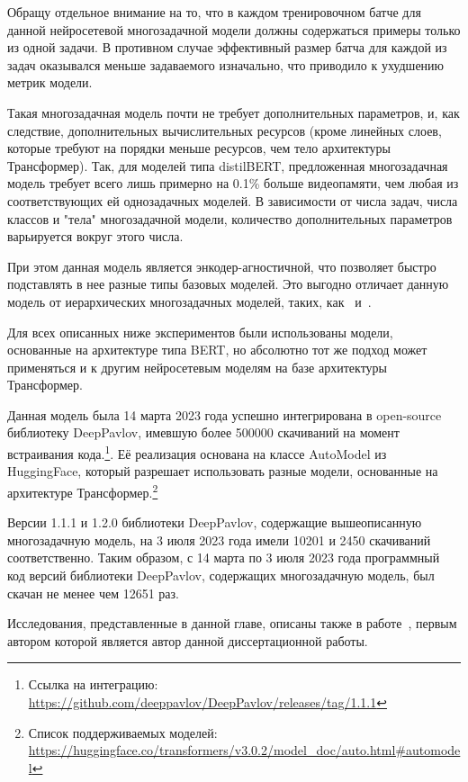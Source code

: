 Обращу отдельное внимание на то, что в каждом тренировочном батче для данной нейросетевой многозадачной модели должны содержаться примеры только из одной задачи. В противном случае эффективный размер батча для каждой из задач оказывался меньше задаваемого изначально, что приводило к ухудшению метрик модели. 

Такая многозадачная модель почти не требует дополнительных параметров, и, как следствие, дополнительных вычислительных ресурсов (кроме линейных слоев, которые требуют на порядки меньше ресурсов, чем тело архитектуры Трансформер). Так, для моделей типа distilBERT, предложенная многозадачная модель требует всего лишь примерно на  0.1\% больше видеопамяти, чем любая из соответствующих ей однозадачных моделей. В зависимости от числа задач, числа классов и "тела" многозадачной модели, количество дополнительных параметров варьируется вокруг этого числа. 

При этом данная модель является энкодер-агностичной, что позволяет быстро подставлять в нее разные типы базовых моделей. Это выгодно отличает данную модель от иерархических многозадачных моделей, таких, как~\cite{stickland_2019} и~\cite{TaskEmbedded2021}.

Для всех описанных ниже экспериментов были использованы модели, основанные на архитектуре типа BERT, но абсолютно тот же подход может применяться и к другим нейросетевым моделям на базе архитектуры Трансформер.

Данная модель была 14 марта 2023 года успешно интегрирована в open-source библиотеку DeepPavlov, имевшую более 500000 скачиваний на момент встраивания кода.\footnote{Ссылка на интеграцию: \url{https://github.com/deeppavlov/DeepPavlov/releases/tag/1.1.1}}. Её реализация основана на классе {AutoModel} из HuggingFace, который разрешает использовать разные модели, основанные на архитектуре Трансформер.\footnote{Список поддерживаемых моделей: \url{https://huggingface.co/transformers/v3.0.2/model_doc/auto.html\#automodel}}

Версии 1.1.1 и 1.2.0 библиотеки DeepPavlov, содержащие вышеописанную многозадачную модель, на 3 июля 2023 года имели 10201 и 2450 скачиваний соответственно. Таким образом, с 14 марта по 3 июля 2023 года программный код версий библиотеки DeepPavlov, содержащих многозадачную модель, был скачан не менее чем 12651 раз. 

Исследования, представленные в данной главе, описаны также в работе~\cite{rumtl}, первым автором которой является автор данной диссертационной работы.



